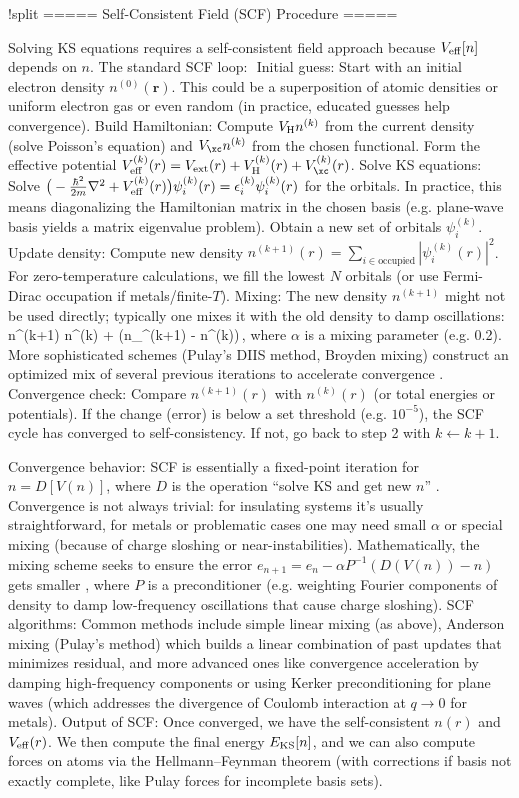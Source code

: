 !split
===== Self-Consistent Field (SCF) Procedure =====

Solving KS equations requires a self-consistent field approach because $V_{\rm eff}[n]$ depends on $n$. The standard SCF loop: 
Initial guess: Start with an initial electron density $n^{(0)}(\mathbf{r})$. This could be a superposition of atomic densities or uniform electron gas or even random (in practice, educated guesses help convergence).
Build Hamiltonian: Compute $V_{\rm H}n^{(k)}$ from the current density (solve Poisson’s equation) and $V_{\xc}n^{(k)}$ from the chosen functional. Form the effective potential $V_{\rm eff}^{(k)}(r) = V_{\rm ext}(r) + V_{\rm H}^{(k)}(r) + V_{\xc}^{(k)}(r)$.
Solve KS equations: Solve $\big(-\frac{\hbar^2}{2m}\nabla^2 + V_{\rm eff}^{(k)}(r)\big)\psi_i^{(k)}(r) = \epsilon_i^{(k)} \psi_i^{(k)}(r)$ for the orbitals. In practice, this means diagonalizing the Hamiltonian matrix in the chosen basis (e.g. plane-wave basis yields a matrix eigenvalue problem). Obtain a new set of orbitals ${\psi_i^{(k)}}$.
Update density: Compute new density $n^{(k+1)}(r) = \sum_{i \in \text{occupied}} |\psi_i^{(k)}(r)|^2$. For zero-temperature calculations, we fill the lowest $N$ orbitals (or use Fermi-Dirac occupation if metals/finite-$T$).
Mixing: The new density $n^{(k+1)}$ might not be used directly; typically one mixes it with the old density to damp oscillations: n^{(k+1)} \leftarrow n^{(k)} + \alpha\big(n_{}^{(k+1)} - n^{(k)}\big)\,, where $\alpha$ is a mixing parameter (e.g. 0.2). More sophisticated schemes (Pulay’s DIIS method, Broyden mixing) construct an optimized mix of several previous iterations to accelerate convergence  .
Convergence check: Compare $n^{(k+1)}(r)$ with $n^{(k)}(r)$ (or total energies or potentials). If the change (error) is below a set threshold (e.g. $10^{-5}$), the SCF cycle has converged to self-consistency. If not, go back to step 2 with $k \leftarrow k+1$.

Convergence behavior: SCF is essentially a fixed-point iteration for $n = D[V(n)]$, where $D$ is the operation “solve KS and get new $n$” . Convergence is not always trivial: for insulating systems it’s usually straightforward, for metals or problematic cases one may need small $\alpha$ or special mixing (because of charge sloshing or near-instabilities). Mathematically, the mixing scheme seeks to ensure the error $e_{n+1} = e_n - \alpha P^{-1}(D(V(n)) - n)$ gets smaller  , where $P$ is a preconditioner (e.g. weighting Fourier components of density to damp low-frequency oscillations that cause charge sloshing).
SCF algorithms: Common methods include simple linear mixing (as above), Anderson mixing (Pulay’s method) which builds a linear combination of past updates that minimizes residual, and more advanced ones like convergence acceleration by damping high-frequency components or using Kerker preconditioning for plane waves (which addresses the divergence of Coulomb interaction at $q\to0$ for metals).
Output of SCF: Once converged, we have the self-consistent $n(r)$ and $V_{\rm eff}(r)$. We then compute the final energy $E_{\rm KS}[n]$, and we can also compute forces on atoms via the Hellmann–Feynman theorem (with corrections if basis not exactly complete, like Pulay forces for incomplete basis sets).

